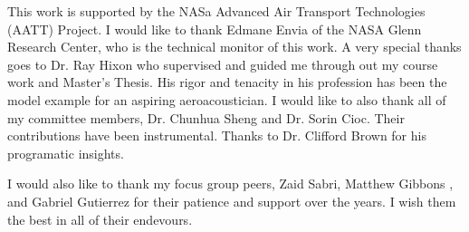 \documentclass[12pt]{uthesis-v12}  %
\begin{document}

\begin{abstractpage}

\end{abstractpage}




\begin{acknowledgments}
\noindent This work is supported by the NASa Advanced Air Transport Technologies
(AATT) Project. I would like to thank Edmane Envia of the NASA Glenn Research Center, who
is the technical monitor of this work. 
A very special thanks goes to Dr. Ray Hixon who supervised and guided me through
out my course work and Master's Thesis. His rigor and tenacity in his profession has 
been the model example for an aspiring aeroacoustician. 
I would like to also thank all of my committee members, Dr. Chunhua Sheng and 
Dr. Sorin Cioc. Their contributions have been instrumental. Thanks to Dr. Clifford
Brown for his programatic insights. 

I would also like to thank my focus group peers, Zaid Sabri, Matthew Gibbons ,
and Gabriel Gutierrez for their patience and support over the years. I wish them the best in all of 
their endevours.


\end{acknowledgments}
\end{document}
